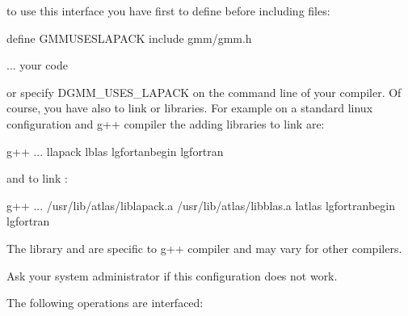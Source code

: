 \documentclass[a4paper,11pt,english]{sphinxmanual}
\begin{document}
to use this interface you have first to define  before including  files:

\begin{sphinxVerbatim}[commandchars=\\\{\}]
\PYGZsh{}define GMM\PYGZus{}USES\PYGZus{}LAPACK
\PYGZsh{}include \PYGZlt{}gmm/gmm.h\PYGZgt{}

... your code
\end{sphinxVerbatim}

or specify \sphinxhyphen{}DGMM\_USES\_LAPACK on the command line of your compiler. Of course, you have also to link  or  libraries. For example on a standard linux configuration and g++ compiler the adding libraries to link  are:

\begin{sphinxVerbatim}[commandchars=\\\{\}]
g++ ...  \PYGZhy{}llapack \PYGZhy{}lblas \PYGZhy{}lgfortanbegin \PYGZhy{}lgfortran
\end{sphinxVerbatim}

and to link  :

\begin{sphinxVerbatim}[commandchars=\\\{\}]
g++ ... /usr/lib/atlas/liblapack.a /usr/lib/atlas/libblas.a \PYGZhy{}latlas \PYGZhy{}lgfortranbegin \PYGZhy{}lgfortran
\end{sphinxVerbatim}

The library  and  are specific to g++ compiler and may vary for other compilers.

Ask your system administrator if this configuration does not work.

The following operations are interfaced:
\end{document}
